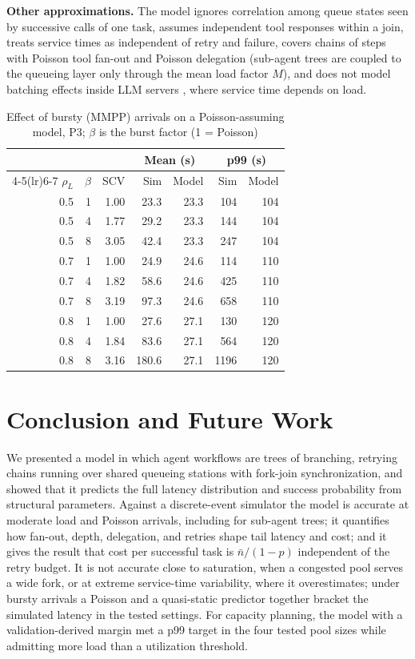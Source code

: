 \documentclass[journal]{IEEEtran}
\begin{document}
\textbf{Other approximations.} The model ignores correlation among queue states seen by successive calls of one task, assumes independent tool responses within a join, treats service times as independent of retry and failure, covers chains of steps with Poisson tool fan-out and Poisson delegation (sub-agent trees are coupled to the queueing layer only through the mean load factor $M$), and does not model batching effects inside LLM servers \cite{kwon2023vllm,yu2022orca}, where service time depends on load.
\begin{table}[t]
\caption{Effect of bursty (MMPP) arrivals on a Poisson-assuming model, P3; $\beta$ is the burst factor (1 = Poisson)}
\label{tab:burst}
\centering
\footnotesize
\setlength{\tabcolsep}{2pt}
\begin{tabular}{rrrrrrr}
\toprule
 & & & \multicolumn{2}{c}{Mean (s)} & \multicolumn{2}{c}{p99 (s)} \\
\cmidrule(lr){4-5}\cmidrule(lr){6-7}
$\rho_L$ & $\beta$ & SCV & Sim & Model & Sim & Model \\
\midrule
0.5 & 1 & 1.00 & 23.3 & 23.3 & 104 & 104 \\
0.5 & 4 & 1.77 & 29.2 & 23.3 & 144 & 104 \\
0.5 & 8 & 3.05 & 42.4 & 23.3 & 247 & 104 \\
\midrule
0.7 & 1 & 1.00 & 24.9 & 24.6 & 114 & 110 \\
0.7 & 4 & 1.82 & 58.6 & 24.6 & 425 & 110 \\
0.7 & 8 & 3.19 & 97.3 & 24.6 & 658 & 110 \\
\midrule
0.8 & 1 & 1.00 & 27.6 & 27.1 & 130 & 120 \\
0.8 & 4 & 1.84 & 83.6 & 27.1 & 564 & 120 \\
0.8 & 8 & 3.16 & 180.6 & 27.1 & 1196 & 120 \\
\bottomrule
\end{tabular}
\end{table}

\section{Conclusion and Future Work}
We presented a model in which agent workflows are trees of branching, retrying chains running over shared queueing stations with fork-join synchronization, and showed that it predicts the full latency distribution and success probability from structural parameters. Against a discrete-event simulator the model is accurate at moderate load and Poisson arrivals, including for sub-agent trees; it quantifies how fan-out, depth, delegation, and retries shape tail latency and cost; and it gives the result that cost per successful task is $\bar n/(1-p)$ independent of the retry budget. It is not accurate close to saturation, when a congested pool serves a wide fork, or at extreme service-time variability, where it overestimates; under bursty arrivals a Poisson and a quasi-static predictor together bracket the simulated latency in the tested settings. For capacity planning, the model with a validation-derived margin met a p99 target in the four tested pool sizes while admitting more load than a utilization threshold.
\end{document}
